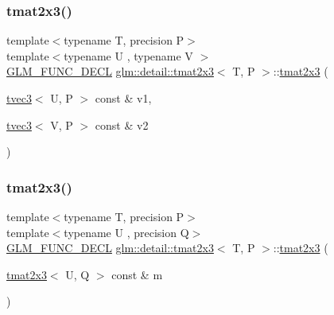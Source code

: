 \mbox{\label{structglm_1_1detail_1_1tmat2x3_ab39c2ee73d04fb527773418e6595be57}} 
\subsubsection{\texorpdfstring{tmat2x3()}{tmat2x3()}\hspace{0.1cm}{\footnotesize\ttfamily [9/22]}}
{\footnotesize\ttfamily template$<$typename T, precision P$>$ \\
template$<$typename U , typename V $>$ \\
\hyperlink{setup_8hpp_ab2d052de21a70539923e9bcbf6e83a51}{G\+L\+M\+\_\+\+F\+U\+N\+C\+\_\+\+D\+E\+CL} \hyperlink{structglm_1_1detail_1_1tmat2x3}{glm\+::detail\+::tmat2x3}$<$ T, P $>$\+::\hyperlink{structglm_1_1detail_1_1tmat2x3}{tmat2x3} (\begin{DoxyParamCaption}\item[{\hyperlink{structglm_1_1detail_1_1tvec3}{tvec3}$<$ U, P $>$ const \&}]{v1,  }\item[{\hyperlink{structglm_1_1detail_1_1tvec3}{tvec3}$<$ V, P $>$ const \&}]{v2 }\end{DoxyParamCaption})}

\mbox{\label{structglm_1_1detail_1_1tmat2x3_aeada8034e24714a14c9d2480f5cf2fb6}} 
\subsubsection{\texorpdfstring{tmat2x3()}{tmat2x3()}\hspace{0.1cm}{\footnotesize\ttfamily [10/22]}}
{\footnotesize\ttfamily template$<$typename T, precision P$>$ \\
template$<$typename U , precision Q$>$ \\
\hyperlink{setup_8hpp_ab2d052de21a70539923e9bcbf6e83a51}{G\+L\+M\+\_\+\+F\+U\+N\+C\+\_\+\+D\+E\+CL} \hyperlink{structglm_1_1detail_1_1tmat2x3}{glm\+::detail\+::tmat2x3}$<$ T, P $>$\+::\hyperlink{structglm_1_1detail_1_1tmat2x3}{tmat2x3} (\begin{DoxyParamCaption}\item[{\hyperlink{structglm_1_1detail_1_1tmat2x3}{tmat2x3}$<$ U, Q $>$ const \&}]{m }\end{DoxyParamCaption})\hspace{0.3cm}{\ttfamily [explicit]}}

